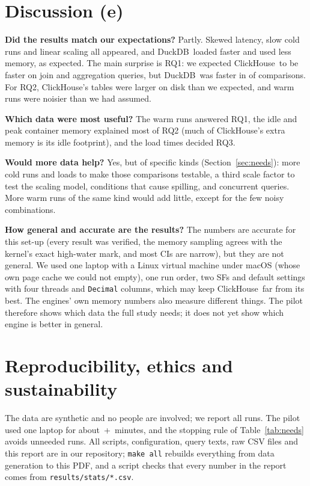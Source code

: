 \documentclass[11pt,a4paper]{article}
\newcommand{\CH}{ClickHouse}
\newcommand{\DK}{DuckDB}
\begin{document}
\section{Discussion (e)}

\textbf{Did the results match our expectations?} Partly.
Skewed latency, slow cold runs and linear scaling all appeared, and \DK\ loaded faster and used less memory, as expected.
The main surprise is RQ1: we expected \CH\ to be faster on join and aggregation queries, but \DK\ was faster in  of  comparisons.
For RQ2, \CH's tables were larger on disk than we expected, and warm runs were noisier than we had assumed.

\textbf{Which data were most useful?} The warm runs answered RQ1, the idle and peak container memory explained most of RQ2 (much of \CH's extra memory is its idle footprint), and the load times decided RQ3.

\textbf{Would more data help?} Yes, but of specific kinds (Section~\ref{sec:needs}): more cold runs and loads to make those comparisons testable, a third scale factor to test the scaling model, conditions that cause spilling, and concurrent queries.
More warm runs of the same kind would add little, except for the few noisy combinations.

\textbf{How general and accurate are the results?} The numbers are accurate for this set-up (every result was verified, the memory sampling agrees with the kernel's exact high-water mark, and most CIs are narrow), but they are not general.
We used one laptop with a Linux virtual machine under macOS (whose own page cache we could not empty), one run order, two SFs and default settings with four threads and \texttt{Decimal} columns, which may keep \CH\ far from its best.
The engines' own memory numbers also measure different things.
The pilot therefore shows which data the full study needs; it does not yet show which engine is better in general.

\FloatBarrier

\section{Reproducibility, ethics and sustainability}

The data are synthetic and no people are involved; we report all runs. The pilot used one laptop for about \,+\, minutes, and the stopping rule of Table~\ref{tab:needs} avoids unneeded runs.
All scripts, configuration, query texts, raw CSV files and this report are in our repository; \texttt{make all} rebuilds everything from data generation to this PDF, and a script checks that every number in the report comes from \texttt{results/stats/*.csv}.
\end{document}
